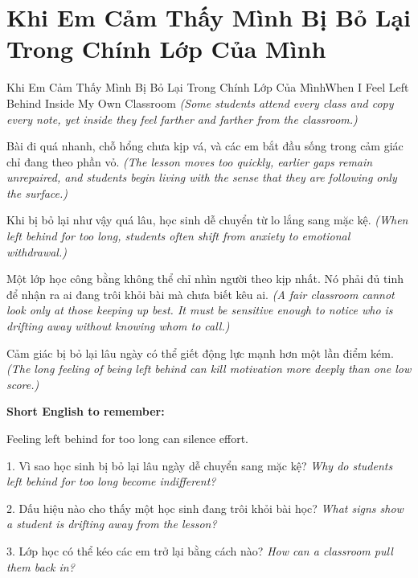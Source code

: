 \section{Khi Em Cảm Thấy Mình Bị Bỏ Lại Trong Chính Lớp Của Mình}
\begin{truyen}{Khi Em Cảm Thấy Mình Bị Bỏ Lại Trong Chính Lớp Của Mình}{When I Feel Left Behind Inside My Own Classroom}
\textit{(Some students attend every class and copy every note, yet inside they feel farther and farther from the classroom.)}

Bài đi quá nhanh, chỗ hổng chưa kịp vá, và các em bắt đầu sống trong cảm giác chỉ đang theo phần vỏ.
\textit{(The lesson moves too quickly, earlier gaps remain unrepaired, and students begin living with the sense that they are following only the surface.)}

Khi bị bỏ lại như vậy quá lâu, học sinh dễ chuyển từ lo lắng sang mặc kệ.
\textit{(When left behind for too long, students often shift from anxiety to emotional withdrawal.)}

Một lớp học công bằng không thể chỉ nhìn người theo kịp nhất. Nó phải đủ tinh để nhận ra ai đang trôi khỏi bài mà chưa biết kêu ai.
\textit{(A fair classroom cannot look only at those keeping up best. It must be sensitive enough to notice who is drifting away without knowing whom to call.)}
\end{truyen}

\begin{baihoc}
Cảm giác bị bỏ lại lâu ngày có thể giết động lực mạnh hơn một lần điểm kém.
\textit{(The long feeling of being left behind can kill motivation more deeply than one low score.)}
\end{baihoc}

\begin{ghinhoanh}
\textbf{Short English to remember:}

Feeling left behind for too long can silence effort.

\end{ghinhoanh}

\begin{tuhocnhanh}
1. Vì sao học sinh bị bỏ lại lâu ngày dễ chuyển sang mặc kệ? \textit{Why do students left behind for too long become indifferent?}

2. Dấu hiệu nào cho thấy một học sinh đang trôi khỏi bài học? \textit{What signs show a student is drifting away from the lesson?}

3. Lớp học có thể kéo các em trở lại bằng cách nào? \textit{How can a classroom pull them back in?}
\end{tuhocnhanh}
\ngancach
